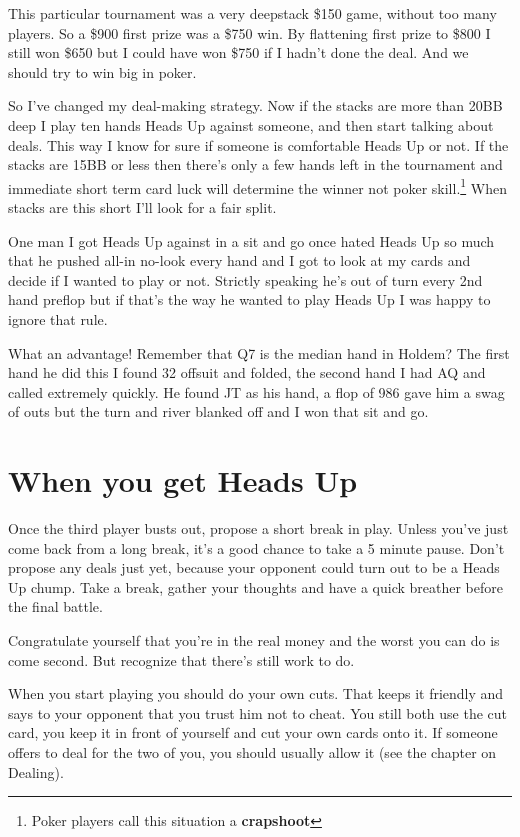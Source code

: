 This particular tournament was a very deepstack \$150
game, without too many players. So a \$900 first prize
was a \$750 win. By flattening first prize to \$800 I still won \$650 but
I could have won \$750 if I hadn't done the deal. And we should
try to win big in poker.

So I've changed my deal-making strategy. Now
if the stacks are more than 20BB deep
I play ten hands Heads Up against someone,
and then start talking about deals. This way I know for sure if someone
is comfortable Heads Up or not. If the stacks are 15BB or less then
there's only a few hands left in the tournament and immediate short term
card luck will determine the winner not poker skill.\footnote{Poker
players call this situation a \textbf{crapshoot}} When stacks are
this short I'll look for a fair split.

One man I got Heads Up against in a sit and go once hated
Heads Up so much that he pushed all-in no-look every hand and
I got to look at my cards and decide if I wanted to play or not.
Strictly speaking he's out of turn every 2nd hand preflop but
if that's the way he wanted to play Heads Up I was happy to
ignore that rule.

What an advantage! Remember that Q7 is the median hand in Holdem?
The first hand he did this I found 32 offsuit
and folded, the second hand I had AQ and called extremely quickly.
He found JT as his hand, a flop of 986 gave him a swag of
outs but the turn and river blanked off and
I won that sit and go.

\section{When you get Heads Up}

Once the third player busts out, propose a short
break in play. Unless you've just come back from
a long break, it's a good chance to take a 5 minute
pause. Don't propose any deals just yet, because
your opponent could turn out to be a Heads Up chump.
Take a break, gather your thoughts and have a quick
breather before the final battle.

Congratulate yourself that you're in the real money
and the worst you can do is come second. But
recognize that there's still work to do.

When you start playing you should do your own
cuts. That keeps it friendly and says to your
opponent that you trust him not to cheat. You
still both use the cut card, you keep it in
front of yourself and cut your own cards onto it.
If someone offers to deal for the two of you, you
should usually allow it (see the chapter on
Dealing).

